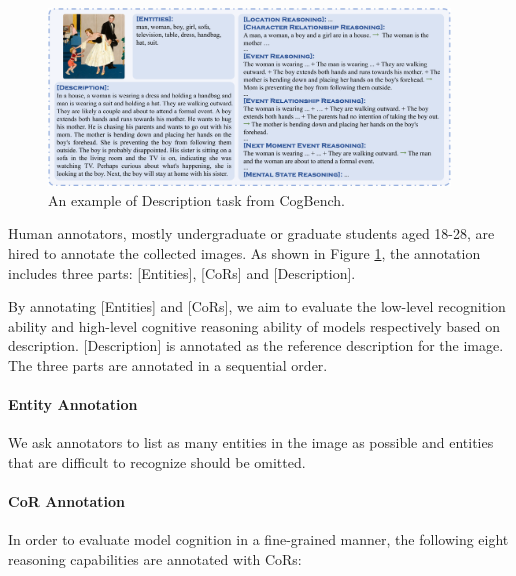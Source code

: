 \begin{figure}[h]
  \centering
  \includegraphics[width=0.95\textwidth]{figs/descrption_task_3.pdf}
  \caption{An example of Description task from CogBench. 
}
  \label{fig:cogbench}
\end{figure}


Human annotators, mostly undergraduate or graduate students aged 18-28, are hired to annotate the collected images. 
As shown in Figure \ref{fig:cogbench}, the annotation includes three parts: [Entities], [CoRs] and [Description].

By annotating [Entities] and [CoRs], we aim to evaluate the low-level recognition ability and high-level cognitive reasoning ability of models respectively based on description. 
[Description] is annotated as the reference description for the image.
The three parts are annotated in a sequential order.

\paragraph{Entity Annotation} We ask annotators to list as many entities in the image as possible and entities
that are difficult to recognize should be omitted. 

\paragraph{CoR Annotation} %
In order to evaluate model cognition in a fine-grained manner, the following eight reasoning capabilities are annotated with CoRs:

